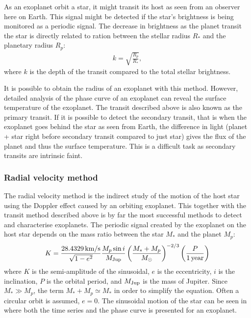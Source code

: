 As an exoplanet orbit a star, it might transit its host as seen from an observer here on Earth. This
signal might be detected if the star's brightness is being monitored as a periodic signal. The
decrease in brightness as the planet transit the star is directly related to ration between the
stellar radius $R_\ast$ and the planetary radius $R_p$:
\begin{align}
  k = \sqrt{\frac{R_p}{R_\ast}},  \label{eq:transit}
\end{align}
where $k$ is the depth of the transit compared to the total stellar brightness.

It is possible to obtain the radius of an exoplanet with this method. However, detailed analysis of
the phase curve of an exoplanet can reveal the surface temperature of the exoplanet. The transit
described above is also known as the primary transit. If it is possible to detect the secondary
transit, that is when the exoplanet goes behind the star as seen from Earth, the difference in light
(planet + star right before secondary transit compared to just star) gives the flux of the planet
and thus the surface temperature. This is a difficult task as secondary transits are intrinsic
faint.


\subsubsection{Radial velocity method}
\label{sec:rvmethod}

The radial velocity method is the indirect study of the motion of the host star using the Doppler
effect caused by an orbiting exoplanet. This together with the transit method described above is by
far the most successful methods to detect and characterise exoplanets. The periodic signal created
by the exoplanet on the host star depends on the mass ratio between the star $M_\ast$ and the planet
$M_p$:
\begin{align}
  K = \frac{\SI{28.4329}{km/s}}{\sqrt{1-e^2}} \frac{M_p\sin i}{M_\mathrm{Jup}} \left( \frac{M_\ast+M_p}{M_\odot} \right)^{-2/3} \left(\frac{P}{\SI{1}{year}}\right)  \label{eq:rv}
\end{align}
where $K$ is the semi-amplitude of the sinusoidal, $e$ is the eccentricity, $i$ is the inclination,
$P$ is the orbital period, and $M_\mathrm{Jup}$ is the mass of Jupiter. Since $M_\ast \gg M_p$, the term
$M_\ast+M_p\simeq M_\ast$ in order to simplify the equation. Often a circular orbit is assumed,
$e=0$. The sinusoidal motion of the star can be seen in  where both the time
series and the phase curve is presented for an exoplanet.

